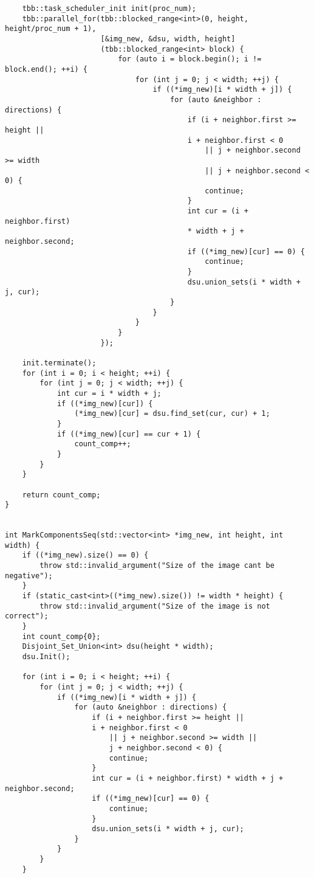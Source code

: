\documentclass{report}
\begin{document}
\begin{lstlisting}
    tbb::task_scheduler_init init(proc_num);
    tbb::parallel_for(tbb::blocked_range<int>(0, height, height/proc_num + 1),
                      [&img_new, &dsu, width, height]
                      (tbb::blocked_range<int> block) {
                          for (auto i = block.begin(); i != block.end(); ++i) {
                              for (int j = 0; j < width; ++j) {
                                  if ((*img_new)[i * width + j]) {
                                      for (auto &neighbor : directions) {
                                          if (i + neighbor.first >= height ||
                                          i + neighbor.first < 0
                                              || j + neighbor.second >= width
                                              || j + neighbor.second < 0) {
                                              continue;
                                          }
                                          int cur = (i + neighbor.first)
                                          * width + j + neighbor.second;
                                          if ((*img_new)[cur] == 0) {
                                              continue;
                                          }
                                          dsu.union_sets(i * width + j, cur);
                                      }
                                  }
                              }
                          }
                      });

    init.terminate();
    for (int i = 0; i < height; ++i) {
        for (int j = 0; j < width; ++j) {
            int cur = i * width + j;
            if ((*img_new)[cur]) {
                (*img_new)[cur] = dsu.find_set(cur, cur) + 1;
            }
            if ((*img_new)[cur] == cur + 1) {
                count_comp++;
            }
        }
    }

    return count_comp;
}


int MarkComponentsSeq(std::vector<int> *img_new, int height, int width) {
    if ((*img_new).size() == 0) {
        throw std::invalid_argument("Size of the image cant be negative");
    }
    if (static_cast<int>((*img_new).size()) != width * height) {
        throw std::invalid_argument("Size of the image is not correct");
    }
    int count_comp{0};
    Disjoint_Set_Union<int> dsu(height * width);
    dsu.Init();

    for (int i = 0; i < height; ++i) {
        for (int j = 0; j < width; ++j) {
            if ((*img_new)[i * width + j]) {
                for (auto &neighbor : directions) {
                    if (i + neighbor.first >= height ||
                    i + neighbor.first < 0
                        || j + neighbor.second >= width ||
                        j + neighbor.second < 0) {
                        continue;
                    }
                    int cur = (i + neighbor.first) * width + j + neighbor.second;
                    if ((*img_new)[cur] == 0) {
                        continue;
                    }
                    dsu.union_sets(i * width + j, cur);
                }
            }
        }
    }


\end{lstlisting}
\end{document}
